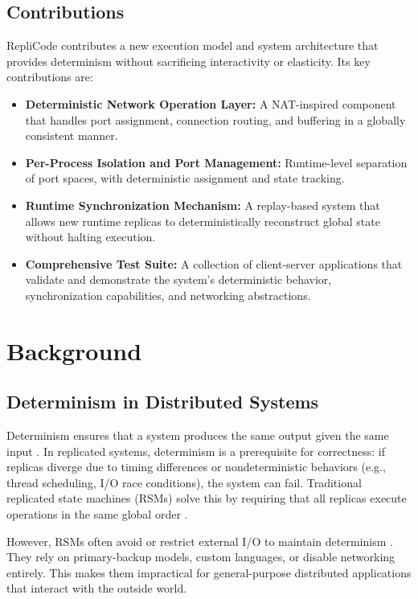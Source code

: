 \documentclass[10pt]{IEEEtran}
\begin{document}
\subsection{Contributions}
RepliCode contributes a new execution model and system architecture that provides determinism without sacrificing interactivity or elasticity. Its key contributions are:

\begin{itemize}
    \item \textbf{Deterministic Network Operation Layer:} A NAT-inspired component that handles port assignment, connection routing, and buffering in a globally consistent manner.
    \item \textbf{Per-Process Isolation and Port Management:} Runtime-level separation of port spaces, with deterministic assignment and state tracking.
    \item \textbf{Runtime Synchronization Mechanism:} A replay-based system that allows new runtime replicas to deterministically reconstruct global state without halting execution.
    \item \textbf{Comprehensive Test Suite:} A collection of client-server applications that validate and demonstrate the system's deterministic behavior, synchronization capabilities, and networking abstractions.
\end{itemize}

\section{Background}

\subsection{Determinism in Distributed Systems}
Determinism ensures that a system produces the same output given the same input \cite{deterministic2010}. In replicated systems, determinism is a prerequisite for correctness: if replicas diverge due to timing differences or nondeterministic behaviors (e.g., thread scheduling, I/O race conditions), the system can fail. Traditional replicated state machines (RSMs) solve this by requiring that all replicas execute operations in the same global order \cite{deterministic2010}.

However, RSMs often avoid or restrict external I/O to maintain determinism \cite{deterministic2009}. They rely on primary-backup models, custom languages, or disable networking entirely. This makes them impractical for general-purpose distributed applications that interact with the outside world.
\end{document}

